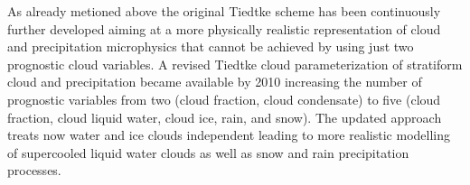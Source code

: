 
As already metioned above the original Tiedtke scheme has been continuously further developed
aiming at a more physically realistic representation of cloud and precipitation microphysics
that cannot be achieved by using just two prognostic cloud variables.
A revised Tiedtke cloud parameterization of stratiform cloud and precipitation became available by 2010
increasing the number of prognostic variables from two (cloud fraction, cloud condensate) to five
(cloud fraction, cloud liquid water, cloud ice, rain, and snow).
The updated approach treats now water and ice clouds independent leading to more realistic
modelling of supercooled liquid water clouds as well as snow and rain precipitation processes.


